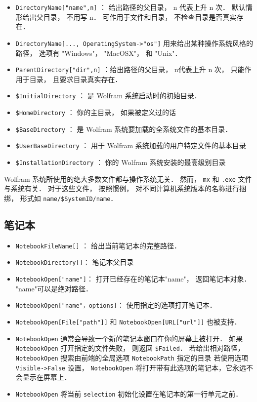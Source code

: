 \begin{itemize}
\item \verb`DirectoryName["name",n]` ： 给出路径的父目录， n 代表上升 n 次． 
默认情形给出父目录， 不用写 n． 可作用于文件和目录， 不检查目录是否真实存在．
\item \verb`DirectoryName[..., OperatingSystem->"os"]` 用来给出某种操作系统风格的路径， 
选项有 "Windows"， "MacOSX"， 和 "Unix"．
\item \verb`ParentDirectory["dir",n]` ：给出路径的父目录， n代表上升 n 次， 
只能作用于目录， 且要求目录真实存在．
\end{itemize}

\begin{itemize}
\item \verb`$InitialDirectory` ：  是 Wolfram 系统启动时的初始目录．
\item \verb`$HomeDirectory` ：  你的主目录， 如果被定义过的话
\item \verb`$BaseDirectory` ：  是 Wolfram 系统要加载的全系统文件的基本目录．
\item \verb`$UserBaseDirectory` ：  用于 Wolfram 系统加载的用户特定文件的基本目录
\item \verb`$InstallationDirectory` ：  你的 Wolfram 系统安装的最高级别目录
\end{itemize}

Wolfram 系统所使用的绝大多数文件都与操作系统无关． 然而， \verb`mx` 和 \verb`.exe` 文件与系统有关．
对于这些文件， 按照惯例， 对不同计算机系统版本的名称进行捆绑， 形式如 \verb`name/$SystemID/name`．

\subsection{笔记本}

\begin{itemize}
\item \verb`NotebookFileName[]` ： 给出当前笔记本的完整路径．
\item \verb`NotebookDirectory[]`： 笔记本父目录
\end{itemize}


\begin{itemize}
\item \verb`NotebookOpen["name"]`：  打开已经存在的笔记本"name"， 返回笔记本对象． "name"可以是绝对路径．
\item \verb`NotebookOpen["name"，options]`： 使用指定的选项打开笔记本．
\item \verb`NotebookOpen[File["path"]]` 和 \verb`NotebookOpen[URL["url"]]` 也被支持．
\item \verb`NotebookOpen` 通常会导致一个新的笔记本窗口在你的屏幕上被打开．
如果 \verb`NotebookOpen` 打开指定的文件失败， 则返回 \verb`$Failed`．
若给出相对路径， \verb`NotebookOpen` 搜索由前端的全局选项 \verb`NotebookPath` 指定的目录
若使用选项 \verb`Visible->False` 设置， \verb`NotebookOpen` 将打开带有此选项的笔记本，它永远不会显示在屏幕上．
\item \verb`NotebookOpen` 将当前 \verb`selection` 初始化设置在笔记本的第一行单元之前．
\end{itemize}

